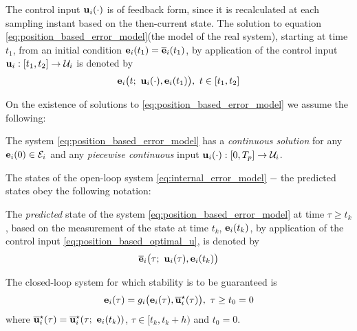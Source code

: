 The control input $\bm{\mathbf{u}}_i(\cdot)$ is of feedback form,
since it is recalculated at each sampling instant based on the then-current
state. The solution to equation \eqref{eq:position_based_error_model}(the model
of the real system), starting at time $t_1$, from an initial condition
$\bm{\mathbf{e}}_i(t_1) = \overline{\bm{\mathbf{e}}}_i(t_1)$,
by application of the control input $\bm{\mathbf{u}}_i : [t_1, t_2] \to \mathcal{U}_i$
is denoted by
\begin{align}
  \bm{\mathbf{e}}_i\big(t;\ \bm{\mathbf{u}}_i(\cdot), \bm{\mathbf{e}}_i(t_1)\big),\ t \in [t_1, t_2]
\end{align}


On the existence of solutions to \eqref{eq:position_based_error_model} we
assume the following:
\begin{bw_box}
\begin{assumption}
  \label{ass:existence_of_solutions_without_disturbance}

  The system \eqref{eq:position_based_error_model} has a
  \textit{continuous solution} for any $\bm{\mathbf{e}}_i(0) \in \mathcal{E}_i$ and
  any \textit{piecewise continuous} input
  $\bm{\mathbf{u}}_i(\cdot) :[0,T_p] \to \mathcal{U}_i$.
\end{assumption}
\end{bw_box}

The states of the open-loop system \eqref{eq:internal_error_model} $-$ the
predicted states obey the following notation:
\begin{bw_box}
\begin{remark}
The \textit{predicted} state of the system \eqref{eq:position_based_error_model}
at time $\tau \geq t_k$ , based on the measurement of the state at time
$t_k$, $\bm{\mathbf{e}}_i(t_k)$, by application of the control input
\eqref{eq:position_based_optimal_u}, is denoted by
\begin{align}
  \overline{\bm{\mathbf{e}}}_i\big(\tau;\ \bm{\mathbf{u}}_i(\tau), \bm{\mathbf{e}}_i(t_k)\big) \label{eq:position_based_predicted_error_0}
\end{align}
\end{remark}
\end{bw_box}

The closed-loop system for which stability is to be guaranteed is
\begin{align}
  \bm{\mathbf{e}}_i(\tau) = g_i\big(\bm{\mathbf{e}}_i(\tau), \overline{\bm{\mathbf{u}}}_i^{\star}(\tau)\big),\ \tau \geq t_0 = 0
  \label{eq:without_disturbances_closed_loop}
\end{align}
where $\overline{\bm{\mathbf{u}}}_i^{\star}(\tau) = \overline{\bm{\mathbf{u}}}_i^{\star}(\tau;\ \bm{\mathbf{e}}_i(t_k))$,
$\tau \in [t_k, t_k + h)$ and $t_0 = 0$.


